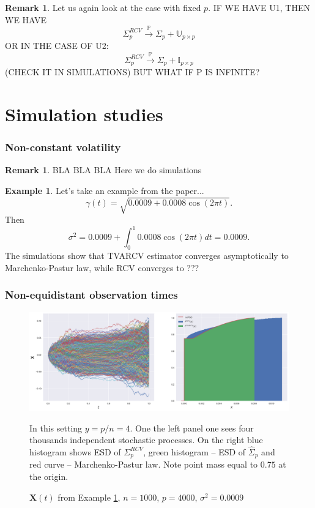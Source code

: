\documentclass[a4paper,11pt]{article}
\theoremstyle{plain}
\theoremstyle{definition}
\newtheorem{exmp}[thm]{Example}
\newtheorem{rmrk}[thm]{Remark}
\newcommand{\MP}{\mathbb{P}}
\begin{document}
    \begin{rmrk}
    	Let us again look at the case with fixed $p$. IF WE HAVE U1, THEN WE HAVE
    	\[ \Sigma_p^{RCV} \xrightarrow{\MP} \Sigma_p + \mathbb{U}_{p \times p}  \]
    	OR IN THE CASE OF U2:
    	\[ \Sigma_p^{RCV} \xrightarrow{\MP} \Sigma_p + \mathbb{I}_{p \times p}  \]
    	(CHECK IT IN SIMULATIONS)
    	BUT WHAT IF P IS INFINITE?
    \end{rmrk}
    
    \pagebreak
    \part{Simulation studies}
    \section*{Non-constant volatility}
    
    \begin{rmrk}
    	BLA BLA BLA Here we do simulations
    \end{rmrk}
    
    \begin{exmp} \label{SimCos}
    	Let's take an example from the paper...
    	\[
    	\gamma(t) = \sqrt{0.0009 + 0.0008 \cos(2 \pi t)}.
    	\]
    	Then
    	\[ \sigma^2 = 0.0009 + \int_{0}^{1}0.0008 \cos(2 \pi t) dt = 0.0009. \]
    	The simulations show that TVARCV estimator converges asymptotically to Marchenko-Pastur law, while RCV converges to ???
    \end{exmp}
    
    
    \section*{Non-equidistant observation times}
    \begin{figure}
    	\begin{center} \centering
    		\includegraphics[scale=0.4]{XCos2}
    		\caption{ $\mathbf{X}(t)$ from Example \ref{SimCos}, $n = 1000$, $p=4000$, $\sigma^2 = 0.0009$ }
    		\smallskip
    		\small
    		In this setting $y = p/n = 4$. One the left panel one sees four thousands independent stochastic processes. On the right blue histogram shows ESD of $\Sigma_p^{RCV}$, green histogram -- ESD of $\widehat{\Sigma}_p$ and red curve -- Marchenko-Pastur law. Note point mass equal to $0.75$ at the origin.
    	\end{center}
    \end{figure}
    
\end{document}

